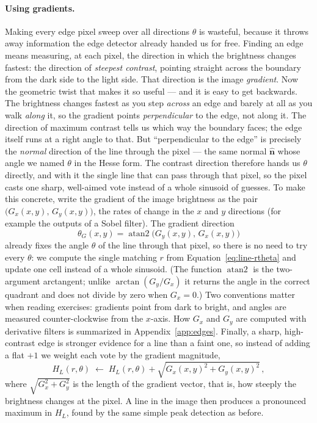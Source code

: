 \paragraph{Using gradients.}
Making every edge pixel sweep over all directions $\theta$ is wasteful, because it
throws away information the edge detector already handed us for free. Finding an
edge means measuring, at each pixel, the direction in which the brightness changes
fastest: the direction of \emph{steepest contrast}, pointing straight across the
boundary from the dark side to the light side. That direction is the image
\emph{gradient}. Now the geometric twist that makes it so useful --- and it is easy
to get backwards. The brightness changes fastest as you step \emph{across} an edge
and barely at all as you walk \emph{along} it, so the gradient points
\emph{perpendicular} to the edge, not along it. The direction of maximum contrast
tells us which way the boundary faces; the edge itself runs at a right angle to
that. But ``perpendicular to the edge'' is precisely the \emph{normal} direction of
the line through the pixel --- the same normal $\hat{\mathbf n}$ whose angle we
named $\theta$ in the Hesse form. The contrast direction therefore hands us
$\theta$ directly, and with it the single line that can pass through that pixel, so
the pixel casts one sharp, well-aimed vote instead of a whole sinusoid of guesses.
To make this concrete, write the gradient of the image brightness as the pair
$\bigl(G_x(x,y),\,G_y(x,y)\bigr)$, the rates of change in the $x$ and $y$
directions (for example the outputs of a Sobel filter). The gradient direction
\begin{equation}
  \theta_G(x,y) = \operatorname{atan2}\!\big(G_y(x,y),\,G_x(x,y)\big)
  \label{eq:gradient-angle}
\end{equation}
\noindent
already fixes the angle $\theta$ of the line through that pixel, so there is no
need to try every $\theta$: we compute the single matching $r$ from
Equation~\eqref{eq:line-rtheta} and update one cell instead of a whole sinusoid.
(The function $\operatorname{atan2}$ is the two-argument arctangent; unlike
$\arctan(G_y/G_x)$ it returns the angle in the correct quadrant and does not
divide by zero when $G_x = 0$.) Two conventions matter when reading exercises:
gradients point from dark to bright, and angles are measured counter-clockwise
from the $x$-axis. How $G_x$ and $G_y$ are computed with derivative filters is
summarized in Appendix~\ref{app:edges}. Finally, a sharp, high-contrast edge is stronger
evidence for a line than a faint one, so instead of adding a flat $+1$ we weight
each vote by the gradient magnitude,
\begin{equation}
  H_L(r,\theta) \;\leftarrow\; H_L(r,\theta)
  + \sqrt{G_x(x,y)^2 + G_y(x,y)^2}\, ,
  \label{eq:hough-vote}
\end{equation}
\noindent
where $\sqrt{G_x^2 + G_y^2}$ is the length of the gradient vector, that is, how
steeply the brightness changes at the pixel. A line in the image then produces a
pronounced maximum in $H_L$, found by the same simple peak detection as before.

